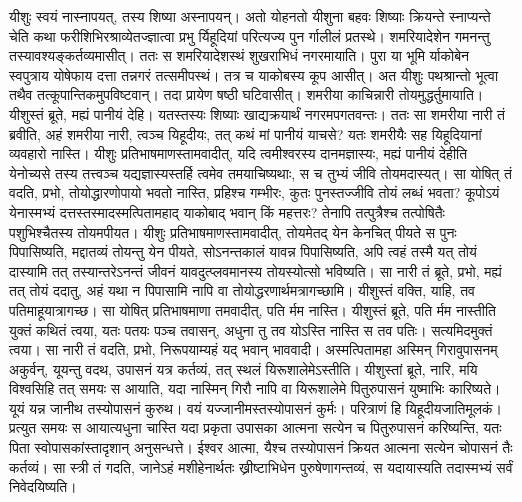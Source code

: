 \adhyAya
{}
\vakya यीशुः स्वयं नास्नापयत्, तस्य शिष्या अस्नापयन्।
\vakya अतो योहनतो यीशुना बहवः शिष्याः क्रियन्ते स्नाप्यन्ते चेति कथा फरीशिभिरश्राव्येतज्ज्ञात्वा
\vakya प्रभु र्यिहूदियां परित्यज्य पुन र्गालीलं प्रतस्थे।
\vakya शमरियादेशेन गमनन्तु तस्यावश्यङ्कर्तव्यमासीत्।
\vakya ततः स शमरियादेशस्थं शुखराभिधं नगरमायाति। पुरा या भूमि र्याकोबेन स्वपुत्राय योषेफाय दत्ता तन्नगरं तत्समीपस्थं।
\vakya तत्र च याकोबस्य कूप आसीत्। अत यीशुः पथश्रान्तो भूत्वा तथैव तत्कूपान्तिकमुपविष्टवान्। तदा प्रायेण षष्ठी घटिवासीत्।
\vakya शमरीया काचिन्नारी तोयमुद्धर्तुमायाति। यीशुस्तं ब्रूते, मह्यं पानीयं देहि।
\vakya यतस्तस्यः शिष्याः खाद्यक्रयार्थं नगरमपगतवन्तः।
\vakya ततः सा शमरीया नारी तं ब्रवीति, अहं शमरीया नारी, त्वञ्च यिहूदीयः, तत् कथं मां पानीयं याचसे? यतः शमरीयैः सह यिहूदियानां व्यवहारो नास्ति।
\vakya यीशुः प्रतिभाषमाणस्तामवादीत्, यदि त्वमीश्वरस्य दानमज्ञास्यः, मह्यं पानीयं देहीति येनोच्यसे तस्य तत्त्वञ्च यद्यज्ञास्यस्तर्हि त्वमेव तमयाचिष्यथाः, स च तुभ्यं जीवि तोयमदास्यत्।
\vakya सा योषित् तं वदति, प्रभो, तोयोद्धारणोपायो भवतो नास्ति, प्रहिश्च गम्भीरः, कुतः पुनस्तज्जीवि तोयं लब्धं भवता?
\vakya कूपोऽयं येनास्मभ्यं दत्तस्तस्मादस्मत्पितामहाद् याकोबाद् भवान् किं महत्तरः? तेनापि तत्पुत्रैश्च तत्पोषितैः पशुभिश्चैतस्य तोयमपीयत।
\vakya यीशुः प्रतिभाषमाणस्तामवादीत्, तोयमेतद् येन केनचित् पीयते स पुनः पिपासिष्यति,
\vakya मद्दातव्यं तोयन्तु येन पीयते, सोऽनन्तकालं यावन्न पिपासिष्यति, अपि त्वहं तस्मै यत् तोयं दास्यामि तत् तस्यान्तरेऽनन्तं जीवनं यावदुत्प्लवमानस्य तोयस्योत्सो भविष्यति।
\vakya सा नारी तं ब्रूते, प्रभो, मह्यं तत् तोयं ददातु, अहं यथा न पिपासामि नापि वा तोयोद्धरणार्थमत्रागच्छामि।
\vakya यीशुस्तं वक्ति, याहि, तव पतिमाहूयात्रागच्छ।
\vakya सा योषित् प्रतिभाषमाणा तमवादीत्, पति र्मम नास्ति।
\vakya यीशुस्तं ब्रूते, पति र्मम नास्तीति युक्तं कथितं त्वया, यतः पतयः पञ्च तवासन्, अधुना तु तव योऽस्ति नास्ति स तव पतिः। सत्यमिदमुक्तं त्वया।
\vakya सा नारी तं वदति, प्रभो, निरूपयाम्यहं यद् भवान् भाववादी।
\vakya अस्मत्पितामहा अस्मिन् गिरावुपासनम् अकुर्वन्, यूयन्तु वदथ, उपासनं यत्र कर्तव्यं, तत् स्थलं यिरूशालेमेऽस्तीति।
\vakya यीशुस्तां ब्रूते, नारि, मयि विश्वसिहि तत् समयः स आयाति, यदा नास्मिन् गिरौ नापि वा यिरूशालेमे पितुरुपासनं युष्माभिः कारिष्यते।
\vakya यूयं यन्न जानीथ तस्योपासनं कुरुथ। वयं यज्जानीमस्तस्योपासनं कुर्मः। परित्राणं हि यिहूदीयजातिमूलकं।
\vakya प्रत्युत समयः स आयात्यधुना चास्ति यदा प्रकृता उपासका आत्मना सत्येन च पितुरुपासनं करिष्यन्ति, यतः पिता स्वोपासकांस्तादृशान् अनुसन्धत्ते।
\vakya ईश्वर आत्मा, यैश्च तस्योपासनं क्रियत आत्मना सत्येन चोपासनं तैः कर्तव्यं।
\vakya सा स्त्री तं गदति, जानेऽहं मशीहेनार्थतः ख्रीष्टाभिधेन पुरुषेणागन्तव्यं, स यदायास्यति तदास्मभ्यं सर्वं निवेदयिष्यति।
